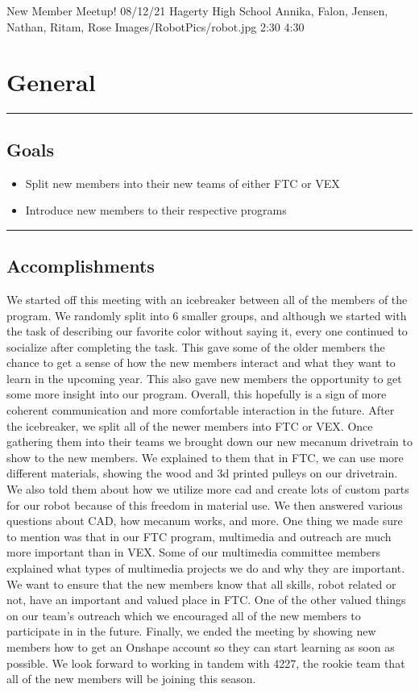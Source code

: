 \insertmeeting 
	{New Member Meetup!} 
	{08/12/21}
	{Hagerty High School}
	{Annika, Falon, Jensen, Nathan, Ritam, Rose}
	{Images/RobotPics/robot.jpg}
	{2:30}
  {4:30}
	
\section*{General}
\noindent\hfil\rule{\textwidth}{.4pt}\hfil
\subsection*{Goals}
\begin{itemize}
    \item Split new members into their new teams of either FTC or VEX
	\item Introduce new members to their respective programs  

\end{itemize} 

\noindent\hfil\rule{\textwidth}{.4pt}\hfil

\subsection*{Accomplishments}
We started off this meeting with an icebreaker between all of the members of the program. We randomly split into 6 smaller groups, and although we started with the task of describing our favorite color without saying it, every one continued to socialize after completing the task. This gave some of the older members the chance to get a sense of how the new members interact and what they want to learn in the upcoming year. This also gave new members the opportunity to get some more insight into our program. Overall, this hopefully is a sign of more coherent communication and more comfortable interaction in the future.
After the icebreaker, we split all of the newer members into FTC or VEX. Once gathering them into their teams we brought down our new mecanum drivetrain to show to the new members. We explained to them that in FTC, we can use more different materials, showing the wood and 3d printed pulleys on our drivetrain. We also told them about how we utilize more cad and create lots of custom parts for our robot because of this freedom in material use. We then answered various questions about CAD, how mecanum works, and more.
One thing we made sure to mention was that in our FTC program, multimedia and outreach are much more important than in VEX. Some of our multimedia committee members explained what types of multimedia projects we do and why they are important. We want to ensure that the new members know that all skills, robot related or not, have an important and valued place in FTC. One of the other valued things on our team's outreach which we encouraged all of the new members to participate in in the future.
Finally, we ended the meeting by showing new members how to get an Onshape account so they can start learning as soon as possible. We look forward to working in tandem with 4227, the rookie team that all of the new members will be joining this season.